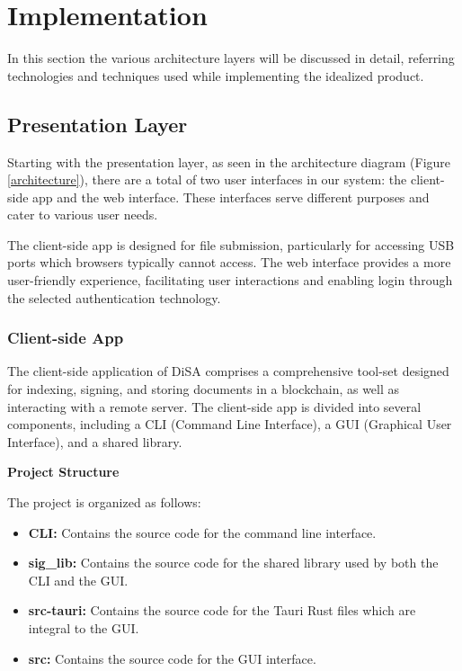 \documentclass[a4paper,11pt]{article}
\begin{document}
    \clearpage
    \section{Implementation}\label{sec:implementation}
        \quad In this section the various architecture layers will be discussed in detail, referring technologies and techniques used while implementing the idealized product.
        
    \subsection{Presentation Layer}
        \quad Starting with the presentation layer, as seen in the architecture diagram (Figure \ref{architecture}), there are a total of two user interfaces in our system: the client-side app and the web interface. These interfaces serve different purposes and cater to various user needs.
        
        The client-side app is designed for file submission, particularly for accessing USB ports which browsers typically cannot access. The web interface provides a more user-friendly experience, facilitating user interactions and enabling login through the selected authentication technology.

       \subsubsection{Client-side App}
            \quad The client-side application of DiSA comprises a comprehensive tool-set designed for indexing, signing, and storing documents in a blockchain, as well as interacting with a remote server. The client-side app is divided into several components, including a CLI (Command Line Interface), a GUI (Graphical User Interface), and a shared library.
            
            \vspace{0.25cm}\textbf{Project Structure}
            
            The project is organized as follows:
            \begin{itemize}
                \item \textbf{CLI:} Contains the source code for the command line interface.
                \item \textbf{sig\_lib:} Contains the source code for the shared library used by both the CLI and the GUI.
                \item \textbf{src-tauri:} Contains the source code for the Tauri \cite{Rust} Rust files which are integral to the GUI.
                \item \textbf{src:} Contains the source code for the GUI interface.
            \end{itemize}
            
\end{document}
